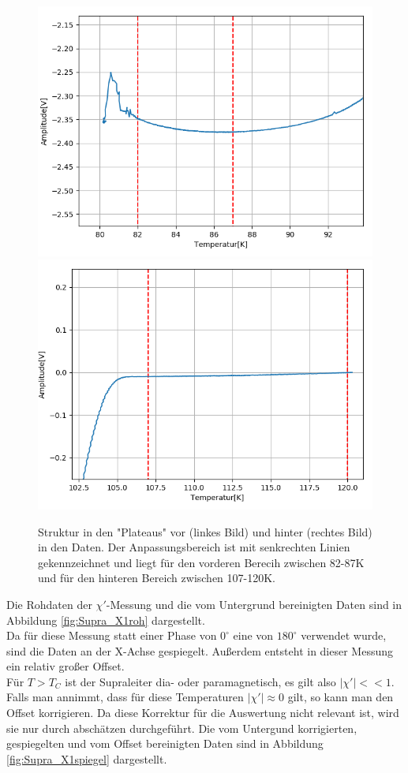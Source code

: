 \documentclass[12pt,a4paper]{article}
\begin{document}
\begin{figure}
\centering
\includegraphics[scale=0.5]{Bilder/Haupt_Supra/X1unten.png}
\includegraphics[scale=0.5]{Bilder/Haupt_Supra/X1oben.png}
\caption{Struktur in den "Plateaus" vor (linkes Bild) und hinter (rechtes Bild) in den Daten. Der Anpassungsbereich ist mit senkrechten Linien gekennzeichnet und liegt für den vorderen Berecih zwischen 82-87K und für den hinteren Bereich zwischen 107-120K.}
\label{fig:Supra_X1struct}
\end{figure}

Die Rohdaten der $\chi'$-Messung und die vom Untergrund bereinigten Daten sind in Abbildung \ref{fig:Supra_X1roh} dargestellt.\\
Da für diese Messung statt einer Phase von $0^\circ$ eine von $180^\circ$ verwendet wurde, sind die Daten an der X-Achse gespiegelt. Außerdem entsteht in dieser Messung ein relativ großer Offset.\\
Für $T>T_C$ ist der Supraleiter dia- oder paramagnetisch, es gilt also $|\chi'| << 1$. Falls man annimmt, dass für diese Temperaturen $|\chi'| \approx 0$ gilt, so kann man den Offset korrigieren. Da diese Korrektur für die Auswertung nicht relevant ist, wird sie nur durch abschätzen durchgeführt.
Die vom Untergund korrigierten, gespiegelten und vom Offset bereinigten Daten sind in Abbildung \ref{fig:Supra_X1spiegel} dargestellt. 
\end{document}
